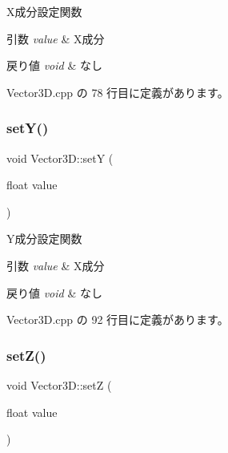 X成分設定関数 


\begin{DoxyParams}{引数}
{\em value} & X成分 \\
\hline
\end{DoxyParams}

\begin{DoxyRetVals}{戻り値}
{\em void} & なし \\
\hline
\end{DoxyRetVals}


 Vector3\+D.\+cpp の 78 行目に定義があります。

\mbox{\label{class_vector3_d_a94311183867a11fc8b7c6fc6a1d100a9}} 
\subsubsection{\texorpdfstring{set\+Y()}{setY()}}
{\footnotesize\ttfamily void Vector3\+D\+::setY (\begin{DoxyParamCaption}\item[{float}]{value }\end{DoxyParamCaption})}



Y成分設定関数 


\begin{DoxyParams}{引数}
{\em value} & X成分 \\
\hline
\end{DoxyParams}

\begin{DoxyRetVals}{戻り値}
{\em void} & なし \\
\hline
\end{DoxyRetVals}


 Vector3\+D.\+cpp の 92 行目に定義があります。

\mbox{\label{class_vector3_d_a33803684829d7be6b3fb746e4b530feb}} 
\subsubsection{\texorpdfstring{set\+Z()}{setZ()}}
{\footnotesize\ttfamily void Vector3\+D\+::setZ (\begin{DoxyParamCaption}\item[{float}]{value }\end{DoxyParamCaption})}



